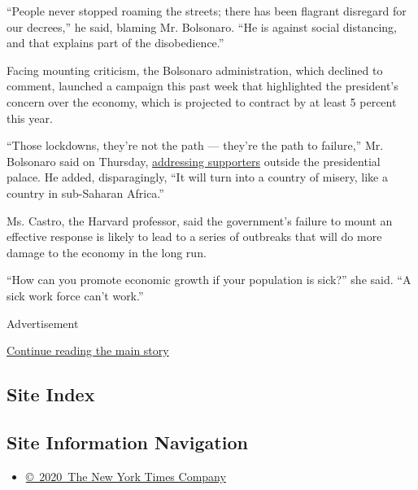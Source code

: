 ``People never stopped roaming the streets; there has been flagrant
disregard for our decrees,'' he said, blaming Mr. Bolsonaro. ``He is
against social distancing, and that explains part of the disobedience.''

Facing mounting criticism, the Bolsonaro administration, which declined
to comment, launched a campaign this past week that highlighted the
president's concern over the economy, which is projected to contract by
at least 5 percent this year.

``Those lockdowns, they're not the path --- they're the path to
failure,'' Mr. Bolsonaro said on Thursday,
\href{https://www.instagram.com/p/CAKwEN7nRHV/}{addressing supporters}
outside the presidential palace. He added, disparagingly, ``It will turn
into a country of misery, like a country in sub-Saharan Africa.''

Ms. Castro, the Harvard professor, said the government's failure to
mount an effective response is likely to lead to a series of outbreaks
that will do more damage to the economy in the long run.

``How can you promote economic growth if your population is sick?'' she
said. ``A sick work force can't work.''

Advertisement

\protect\hyperlink{after-bottom}{Continue reading the main story}

\hypertarget{site-index}{%
\subsection{Site Index}\label{site-index}}

\hypertarget{site-information-navigation}{%
\subsection{Site Information
Navigation}\label{site-information-navigation}}

\begin{itemize}
\tightlist
\item
  \href{https://help.nytimes3xbfgragh.onion/hc/en-us/articles/115014792127-Copyright-notice}{©~2020~The
  New York Times Company}
\end{itemize}

